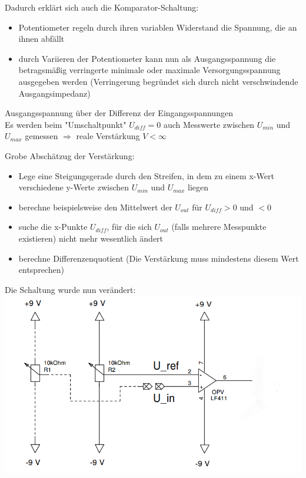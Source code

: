 \documentclass[compress,11pt]{beamer}
\begin{document}
\begin{frame}
Dadurch erklärt sich auch die Komparator-Schaltung:
\begin{itemize}
\item Potentiometer regeln durch ihren variablen Widerstand die Spannung, die an ihnen abfällt
\item durch Variieren der Potentiometer kann nun als Ausgangsspannung die betragsmäßig verringerte minimale oder maximale Versorgungsspannung ausgegeben werden (Verringerung begründet sich durch nicht verschwindende Ausgangsimpedanz)
\end{itemize}
\end{frame}
\begin{frame}
Ausgangsspannung über der Differenz der Eingangsspannungen\\ 
Es werden beim "Umschaltpunkt" $U_{diff} = 0$ auch Messwerte zwischen $U_{min}$ und $U_{max}$ gemessen $\Rightarrow$ reale Verstärkung $V < \infty$
\end{frame} 
\begin{frame}
Grobe Abschätzug der Verstärkung:\begin{itemize}

\item Lege eine Steigungsgerade durch den Streifen, in dem zu einem x-Wert verschiedene y-Werte zwischen $U_{min}$ und $U_{max}$ liegen
\item berechne beispielsweise den Mittelwert der $U_{out}$ für $U_{diff} > 0$ und $ < 0$
\item suche die x-Punkte $U_{diff}$, für die sich $U_{out}$ (falls mehrere Messpunkte existieren) nicht mehr wesentlich ändert
\item berechne Differenzenquotient (Die Verstärkung muss mindestens diesem Wert entsprechen)
\end{itemize}
\end{frame}


\begin{frame}
Die Schaltung wurde nun verändert:\\

\includegraphics[width=.7\textwidth]{schalt/schalt11}


\end{frame}
\begin{frame}

\end{frame}
\end{document}
